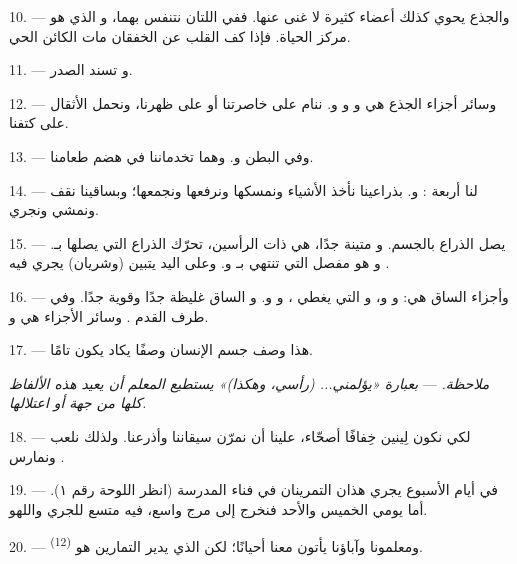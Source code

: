 10. --- والجذع يحوي كذلك أعضاء كثيرة لا غنى عنها. ففي 
 اللتان نتنفس بهما، و الذي هو مركز الحياة.
فإذا كف القلب عن الخفقان مات الكائن الحي.

11. --- و تسند الصدر.

12. --- وسائر أجزاء الجذع هي  و
و و. ننام على خاصرتنا أو على ظهرنا، ونحمل
الأثقال على كتفنا.

13. --- وفي البطن  و. وهما تخدماننا في هضم
طعامنا.

\VUsaut{4.4mm}
\VUsaut{3.0mm}

14. --- لنا أربعة :  و.
بذراعينا نأخذ الأشياء ونمسكها ونرفعها ونجمعها؛ وبساقينا نقف ونمشي ونجري.

15. ---  يصل الذراع بالجسم. و متينة جدًا، هي
ذات الرأسين، تحرّك الذراع التي يصلها  بـ.
و هو مفصل  التي تنتهي بـ
و. وعلى اليد يتبين  (وشريان) يجري فيه
.

16. --- وأجزاء الساق هي:  و
و، و التي يغطي 
، و و. و الساق
غليظة جدًا وقوية جدًا. وفي طرف القدم . وسائر الأجزاء
هي  و.

17. --- هذا وصف جسم الإنسان وصفًا يكاد يكون تامًا.

\textit{ملاحظة.} --- \textit{بعبارة «يؤلمني... (رأسي، وهكذا)» يستطيع
المعلم أن يعيد هذه الألفاظ كلها من جهة} 
\textit{أو اعتلالها.}

\VUsaut{5.0mm}
\VUsaut{2.4mm}
\VUsaut{3.0mm}

18. --- لكي نكون لِينين خِفافًا أصحّاء، علينا أن نمرّن سيقاننا وأذرعنا.
ولذلك نلعب ونمارس .

19. --- في أيام الأسبوع يجري هذان التمرينان في فناء المدرسة (انظر اللوحة
رقم ١). أما يومي الخميس والأحد فنخرج إلى مرج واسع، فيه متسع للجري
واللهو.

20. --- ومعلمونا وآباؤنا يأتون معنا أحيانًا؛ لكن الذي يدير التمارين هو
 \textsuperscript{(12)}.

